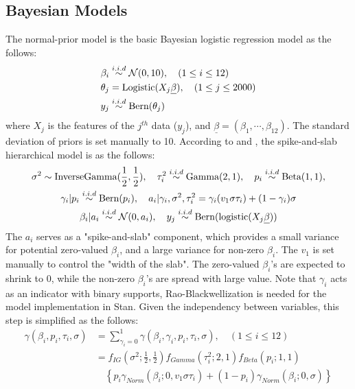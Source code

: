 \documentclass[12pt]{article}
\begin{document}
\subsection{Bayesian Models}
The normal-prior model is the basic Bayesian logistic regression model as the follows:
\begin{align*}
    \beta_i &\stackrel{i.i.d}\sim {\cal N}(0,10), \quad (1\leq i\leq12)\\
    \theta_j &= \text{Logistic}(X_j\underline\beta), \quad (1\leq j \leq2000) \\
     y_j &\stackrel{i.i.d}\sim \text{Bern}(\theta_j)
\end{align*}
where $X_j$ is the features of the $j^{th}$ data ($y_j$), and $\underline\beta = (\beta_1,\cdots,\beta_{12})$. The standard deviation of priors is set manually to 10.
According to \cite{selection} and \cite{sas}, the spike-and-slab hierarchical model is as the follows:
\begin{gather*}
    \sigma^2 \sim \text{InverseGamma}(\frac12,\frac12), \quad
    \tau_i^2 \stackrel{i.i.d}\sim \text{Gamma}(2,1), \quad
    p_i \stackrel{i.i.d}\sim \text{Beta}(1,1),\\ 
    \gamma_i|p_i \stackrel{i.i.d}\sim \text{Bern}(p_i), \quad
    a_i|\gamma_i,\sigma^2,\tau_i^2 = \gamma_i(v_1\sigma\tau_i) + (1-\gamma_i)\sigma\\
    \beta_i|a_i \stackrel{i.i.d}\sim {\cal N}(0,a_i), \quad
    y_j \stackrel{i.i.d}\sim \text{Bern}(\text{logistic}(X_j\underline\beta))
\end{gather*}
The $a_i$ serves as a "spike-and-slab" component, which provides a small variance for potential zero-valued $\beta_i$, and a large variance for non-zero $\beta_i$. The $v_1$ is set manually to control the "width of the slab". The zero-valued $\beta_i$'s are expected to shrink to 0, while the non-zero $\beta_i$'s are spread with large value. Note that $\gamma_i$ acts as an indicator with binary supports, Rao-Blackwellization is needed for the model implementation in Stan. Given the independency between variables, this step is simplified as the follows:
\begin{align*}
    \gamma(\beta_i,p_i,\tau_i,\sigma)&=\sum_{\gamma_i=0}^1 \gamma(\beta_i,\gamma_i,p_i,\tau_i,\sigma), \quad (1\leq i\leq 12) \\
&=f_{IG}(\sigma^2;\frac12,\frac12)f_{Gamma}(\tau_i^2;2,1)f_{Beta}(p_i;1,1)\\
&\quad \left\{ p_i\gamma_{Norm}(\beta_i;0,v_1\sigma\tau_i) + (1-p_i)\gamma_{Norm}(\beta_i;0,\sigma) \right\}
\end{align*}
\end{document}
